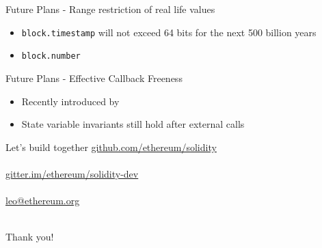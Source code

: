 \documentclass{beamer}
\newcommand{\code}[1]{\texttt{#1}}
\begin{document}
\begin{frame}{Future Plans - Range restriction of real life values}
\begin{itemize}
	\item \code{block.timestamp} will not exceed 64 bits for the next 500 billion years \bigskip
	\item \code{block.number}
\end{itemize}
\end{frame}

\begin{frame}{Future Plans - Effective Callback Freeness}
\begin{itemize}
	\item Recently introduced by~\cite{Grossman} \bigskip
	\item State variable invariants still hold after external calls
\end{itemize}
\end{frame}

\begin{frame}{Let's build together}
\url{github.com/ethereum/solidity}\\~\\
\url{gitter.im/ethereum/solidity-dev}\\~\\
\url{leo@ethereum.org}\\~\\
\begin{center}
Thank you!
\end{center}
\end{frame}
\end{document}
